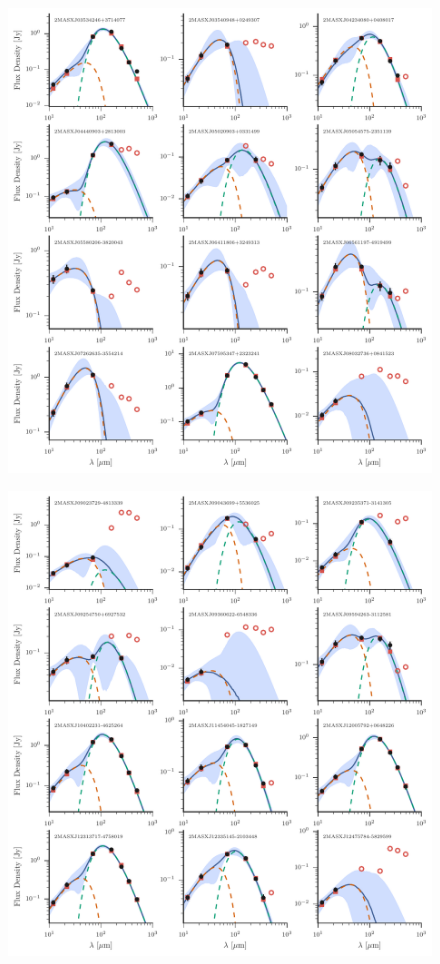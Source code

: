 \begin{figure}
\centering
\includegraphics[width=\textwidth]{figures/sedfig2}
\caption{}
\end{figure}

\begin{figure}
\centering
\includegraphics[width=\textwidth]{figures/sedfig3}
\caption{}
\end{figure}

